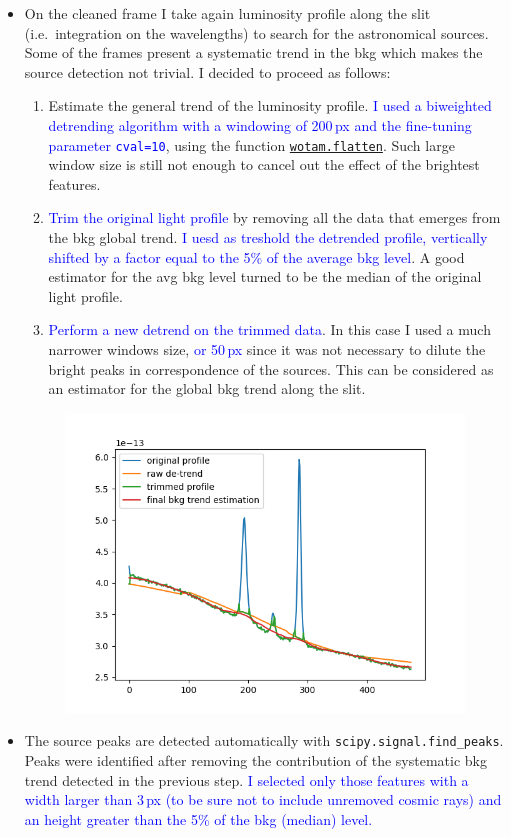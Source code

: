 \documentclass{article}
\newcommand{\arbitrario}[1]{\textcolor{blue}{#1}}
\begin{document}
\begin{itemize}
	\item On the cleaned frame I take again luminosity profile along the slit (i.e.\ integration on the wavelengths) to search for the astronomical sources.
	Some of the frames present a systematic trend in the bkg which makes the source detection not trivial. I decided to proceed as follows:
	\begin{enumerate}
		\item Estimate the general trend of the luminosity profile. \arbitrario{I used a biweighted detrending algorithm with a windowing of 200\,px and the fine-tuning parameter \texttt{cval=10}}, using the function \href{https://github.com/hippke/wotan}{\texttt{wotam.flatten}}. Such large window size is still not enough to cancel out the effect of the brightest features.
		\item \arbitrario{Trim the original light profile} by removing all the data that emerges from the bkg global trend. \arbitrario{I uesd as treshold the detrended profile, vertically shifted by a factor equal to the 5\% of the average bkg level}. A good estimator for the avg bkg level turned to be the median of the original light profile.
		\item \arbitrario{Perform a new detrend on the trimmed data}. In this case I used a much narrower windows size, \arbitrario{or 50\,px} since it was not necessary to dilute the bright peaks in correspondence of the sources. This can be considered as an estimator for the global bkg trend along the slit.
	\end{enumerate}
	\begin{figure}[h!]
		\centering
		\includegraphics[width=.65\textwidth]{detrend_example}
	\end{figure}
	\item The source peaks are detected automatically with \texttt{scipy.signal.find\_peaks}. Peaks were identified after removing the contribution of the systematic bkg trend detected in the previous step. \arbitrario{I selected only those features with a width larger than 3\,px (to be sure not to include unremoved cosmic rays) and an height greater than the 5\% of the bkg (median) level.}
	

\end{itemize}
\end{document}
